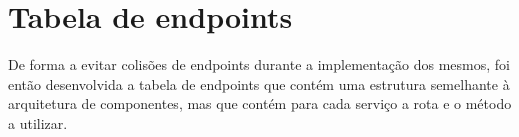 \section{Tabela de endpoints}
De forma a evitar colisões de endpoints durante a implementação dos mesmos, foi então desenvolvida a tabela de endpoints que contém uma estrutura semelhante à arquitetura de componentes, mas que contém para cada serviço a rota e o método a utilizar.

